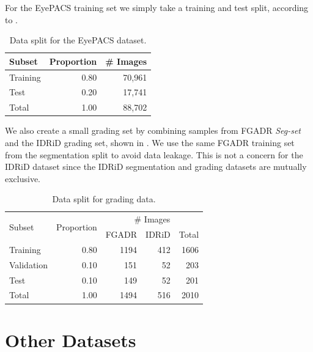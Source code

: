 For the EyePACS training set we simply take a training and test split, according to .

\begin{table}[h]
    \centering
    \begin{tabular}{lrr}
        \toprule
        Subset & Proportion & \# Images \\
        \midrule
        Training & 0.80 & 70,961 \\
        Test & 0.20 & 17,741 \\
        \midrule
        Total & 1.00 & 88,702 \\
        \bottomrule
    \end{tabular}
    \caption{Data split for the EyePACS dataset.}
    \label{tab:eyepacs_split}
\end{table}

We also create a small grading set by combining samples from FGADR \emph{Seg-set} and the IDRiD grading set, shown in .
We use the same FGADR training set from the segmentation split to avoid data leakage.
This is not a concern for the IDRiD dataset since the IDRiD segmentation and grading datasets are mutually exclusive.

\begin{table}[h]
    \centering
    \begin{tabular}{lrrrr}
        \toprule
        \multirow{2}{*}{Subset} & \multirow{2}{*}{Proportion} & \multicolumn{3}{c}{\# Images} \\
        \cmidrule{3-5}
         & & FGADR & IDRiD & Total \\
        \midrule
        Training & 0.80 & 1194 & 412 & 1606 \\
        Validation & 0.10 & 151 & 52 & 203 \\
        Test & 0.10 & 149 & 52 & 201  \\
        \midrule
        Total & 1.00 & 1494 & 516 & 2010  \\
        \bottomrule
    \end{tabular}
    \caption{Data split for grading data.}
    \label{tab:grading_split}
\end{table}

\section{Other Datasets}

